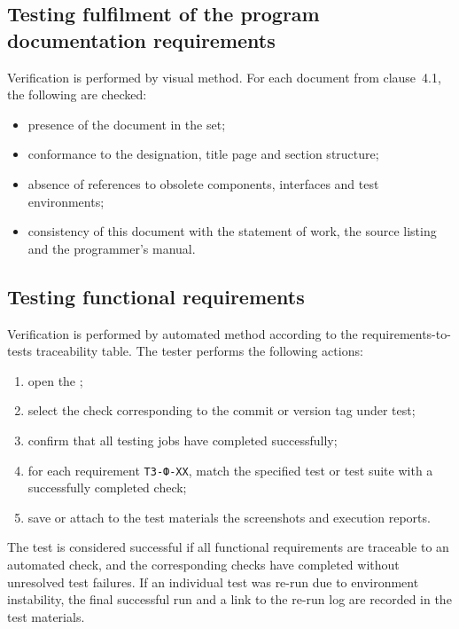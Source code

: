 \documentclass[12pt,a4paper]{extarticle}
\begin{document}
\subsection{Testing fulfilment of the program documentation requirements}

Verification is performed by visual method. For each document from clause~4.1, the following are checked:

\begin{itemize}[leftmargin=1.25cm]
    \item presence of the document in the set;
    \item conformance to the designation, title page and section structure;
    \item absence of references to obsolete components, interfaces and test environments;
    \item consistency of this document with the statement of work, the source listing and the programmer's manual.
\end{itemize}

\subsection{Testing functional requirements}

\begin{hseExample}
Verification is performed by automated method according to the requirements-to-tests traceability table. The tester performs the following actions:

\begin{enumerate}[label=\arabic*), leftmargin=1.25cm]
    \item open the ;
    \item select the check corresponding to the commit or version tag under test;
    \item confirm that all testing jobs have completed successfully;
    \item for each requirement \texttt{ТЗ-Ф-XX}, match the specified test or test suite with a successfully completed check;
    \item save or attach to the test materials the screenshots and execution reports.
\end{enumerate}

The test is considered successful if all functional requirements are traceable to an automated check, and the corresponding checks have completed without unresolved test failures. If an individual test was re-run due to environment instability, the final successful run and a link to the re-run log are recorded in the test materials.
\end{hseExample}
\end{document}
